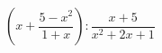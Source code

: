 \begin{ex}[type=expression]
	\begin{condition}
		\( \left( x+\dfrac{5-x^2}{1+x} \right):\dfrac{x+5}{x^2+2x+1} \)
	\end{condition}
\end{ex}